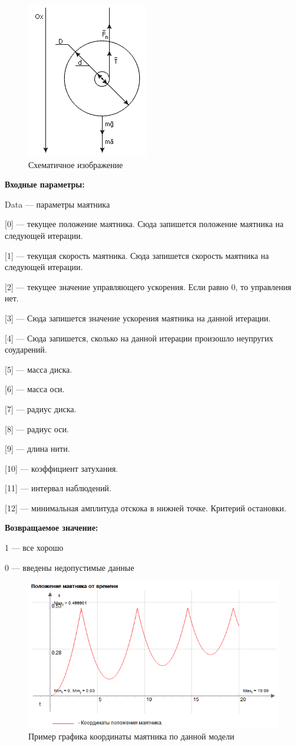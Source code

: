   \begin{figure} [h] 
   \center
   \includegraphics {HML_PendulumOfMaxwell3.png}
   \caption{Схематичное изображение} 
   \label{img:HML_PendulumOfMaxwell3}  
 \end{figure}

\textbf{Входные параметры:}
 
Data --- параметры маятника
 
 [0] --- текущее положение маятника. Сюда запишется положение маятника на  следующей итерации.
 
 [1] --- текущая скорость маятника. Сюда запишется скорость маятника на следующей итерации.
 
 [2] --- текущее значение управляющего ускорения. Если равно 0, то управления нет.
 
 [3] --- Сюда запишется значение ускорения маятника на данной итерации.
 
 [4] --- Сюда запишется, сколько на данной итерации произошло неупругих соударений.
 
 [5] --- масса диска.
 
 [6] --- масса оси.
 
 [7] --- радиус диска.
 
 [8] --- радиус оси.
 
 [9] --- длина нити.
 
 [10] --- коэффициент затухания.
 
 [11] --- интервал наблюдений.
 
 [12] --- минимальная амплитуда отскока в нижней точке. Критерий остановки.

\textbf{Возвращаемое значение:}
 
1 --- все хорошо
 
0 --- введены недопустимые данные

 \begin{figure} [h] 
   \center
   \includegraphics {HML_PendulumOfMaxwell.png}
   \caption{Пример графика координаты маятника по данной модели} 
   \label{img:HML_PendulumOfMaxwell}  
 \end{figure}